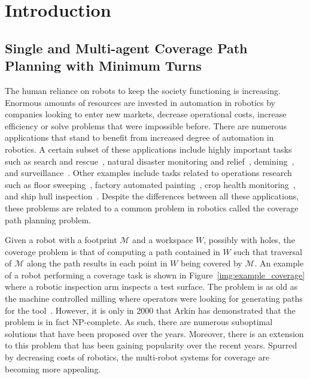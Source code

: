 \documentclass[../main.tex]{subfiles}
\begin{document}
\chapter{Introduction}
\label{chapter:introduction}

\section{Single and Multi-agent Coverage Path Planning with Minimum Turns}
\label{section:coverage_path_planning_with_minimum_turns}

The human reliance on robots to keep the society functioning is increasing. Enormous amounts of resources are invested in automation in robotics by companies looking to enter new markets, decrease operational costs, increase efficiency or solve problems that were impossible before. There are numerous applications that stand to benefit from increased degree of automation in robotics. A certain subset of these applications include highly important tasks such as search and rescue~\cite{ryan2005mode}, natural disaster monitoring and relief~\cite{debusk2010unmanned}, demining~\cite{acar2003path}, and surveillance~\cite{quigley2005target}. Other examples include tasks related to operations research such as floor sweeping~\cite{hofner1994path}, factory automated painting~\cite{sheng2000automated}, crop health monitoring~\cite{rydberg2007field}, and ship hull inspection~\cite{walter2008slam}. Despite the differences between all these applications, these problems are related to a common problem in robotics called the coverage path planning problem.

Given a robot with a footprint $\mathcal{M}$ and a workspace $W$, possibly with holes, the coverage problem is that of computing a path contained in $W$ such that traversal of $\mathcal{M}$ along the path results in each point in $W$ being covered by $\mathcal{M}$. An example of a robot performing a coverage task is shown in Figure~\ref{img:example_coverage} where a robotic inspection arm inspects a test surface. The problem is as old as the machine controlled milling where operators were looking for generating paths for the tool~\cite{held1991computational}. However, it is only in 2000 that Arkin\cite{arkin2000approximation} has demonstrated that the problem is in fact NP-complete. As such, there are numerous suboptimal solutions that have been proposed over the years. Moreover, there is an extension to this problem that has been gaining popularity over the recent years. Spurred by decreasing costs of robotics, the multi-robot systems for coverage are becoming more appealing.
\end{document}
